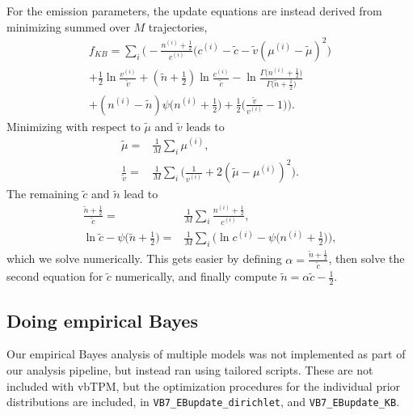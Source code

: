 For the emission parameters, the update equations are instead derived
from minimizing  summed over $M$ trajectories,
\begin{multline}
  f_{KB}=\sum_i\Bigg(
  -\frac{n^{(i)}+\frac 12}{c^{(i)}} \Big(c^{(i)}-\tilde c-\tilde v(\mu^{(i)}-\tilde
  \mu)^2\Big)\\ +\frac 12\ln\frac{v^{(i)}}{\tilde v} +(\tilde
  n+\frac 12)\ln\frac{c^{(i)}}{\tilde c}
  -\ln\frac{\Gamma\big(n^{(i)}+\frac 12\big)}{\Gamma\big(\tilde n+\frac
    12\big)}\\ +(n^{(i)}-\tilde n)\psi\big(n^{(i)}+\frac 12\big)
  +\frac{1}{2}\Big(\frac{\tilde v}{v^{(i)}} -1\Big)\Bigg).
\end{multline}
Minimizing with respect to $\tilde\mu$ and $\tilde v$ leads to
\begin{align}
   \tilde\mu=&\frac{1}{M}\sum_i\mu^{(i)},\\
   \frac{1}{\tilde v}=&
   \frac{1}{M}\sum_i\Big(\frac{1}{v^{(i)}}+2(\tilde\mu-\mu^{(i)})^2\Big).
\end{align}
The remaining $\tilde c$ and $\tilde n$ lead to
\begin{align}
  \frac{\tilde n+\frac 12}{\tilde c}=&
  \frac{1}{M}\sum_i\frac{n^{(i)}+\frac 12}{c^{(i)}},\\
  \ln\tilde c-\psi\big(\tilde n+\frac 12\big)=&
  \frac{1}{M}\sum_i\bigg(
\ln c^{(i)}-\psi\big(n^{(i)}+\frac 12\big)\bigg),
\end{align}
which we solve numerically. This gets easier by defining
$\alpha=\frac{\tilde n+\frac 12}{\tilde c}$, then solve the second
equation for $\tilde c$ numerically, and finally compute $\tilde
n=\alpha\tilde c-\frac 12$.

\subsection{Doing empirical Bayes}
Our empirical Bayes analysis of multiple models was not implemented as
part of our analysis pipeline, but instead ran using tailored
scripts. These are not included with vbTPM, but the optimization
procedures for the individual prior distributions are included, in
\verb+VB7_EBupdate_dirichlet+, and \verb+VB7_EBupdate_KB+.
